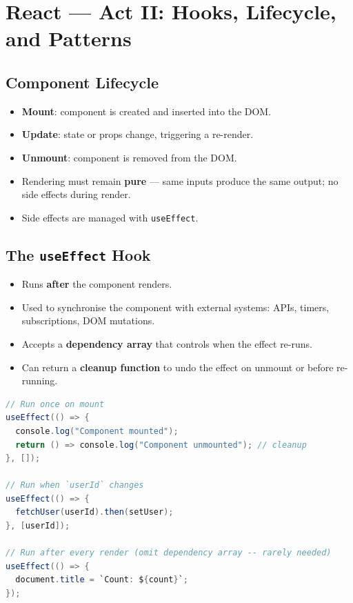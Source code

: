 \documentclass[hidelinks]{article}
\begin{document}
\newpage
\section{React --- Act II: Hooks, Lifecycle, and Patterns}

\subsection{Component Lifecycle}
\begin{itemize}
  \item \textbf{Mount}: component is created and inserted into the DOM.
  \item \textbf{Update}: state or props change, triggering a re-render.
  \item \textbf{Unmount}: component is removed from the DOM.
  \item Rendering must remain \textbf{pure} --- same inputs produce the same output; no side effects during render.
  \item Side effects are managed with \texttt{useEffect}.
\end{itemize}

\subsection{The \texttt{useEffect} Hook}
\begin{itemize}
  \item Runs \textbf{after} the component renders.
  \item Used to synchronise the component with external systems: APIs, timers, subscriptions, DOM mutations.
  \item Accepts a \textbf{dependency array} that controls when the effect re-runs.
  \item Can return a \textbf{cleanup function} to undo the effect on unmount or before re-running.
\end{itemize}

\begin{lstlisting}[language=Java, caption={useEffect variations}]
// Run once on mount
useEffect(() => {
  console.log("Component mounted");
  return () => console.log("Component unmounted"); // cleanup
}, []);

// Run when `userId` changes
useEffect(() => {
  fetchUser(userId).then(setUser);
}, [userId]);

// Run after every render (omit dependency array -- rarely needed)
useEffect(() => {
  document.title = `Count: ${count}`;
});
\end{lstlisting}
\end{document}
